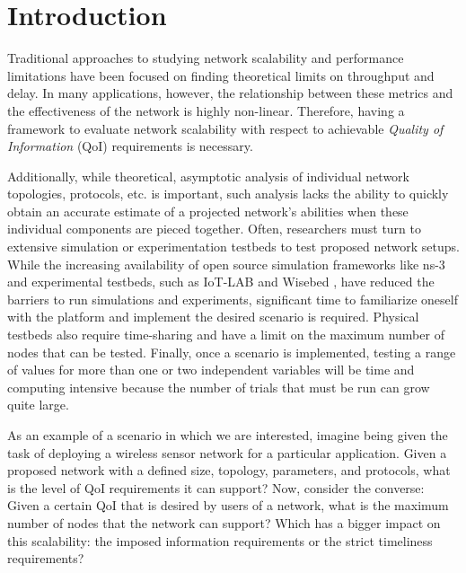 \section{Introduction}
\label{sec:intro}


Traditional approaches to studying network scalability and performance limitations have been focused on finding theoretical limits on throughput and delay.  In many applications, however, the relationship between these metrics and the effectiveness of the network is highly non-linear.  Therefore, having a framework to evaluate network scalability with respect to achievable \emph{Quality of Information} (QoI) requirements is necessary.

Additionally, while theoretical, asymptotic analysis of individual network topologies, protocols, etc. is important, such analysis lacks the ability to quickly obtain an accurate estimate of a projected network's abilities when these individual components are pieced together. Often, researchers must turn to extensive simulation or experimentation testbeds to test proposed network setups. While the increasing availability of open source simulation frameworks like ns-3 \cite{ns3} and experimental testbeds, such as IoT-LAB \cite{iot_lab_exp_platform} and Wisebed \cite{wisebed}, have reduced the barriers to run simulations and experiments, significant time to familiarize oneself with the platform and implement the desired scenario is required. Physical testbeds also require time-sharing and have a limit on the maximum number of nodes that can be tested. Finally, once a scenario is implemented, testing a range of values for more than one or two independent variables will be time and computing intensive because the number of trials that must be run can grow quite large.

As an example of a scenario in which we are interested, imagine being given the task of deploying a wireless sensor network for a particular application. Given a proposed network with a defined size, topology, parameters, and protocols, what is the level of QoI requirements it can support?  Now, consider the converse:  Given a certain QoI that is desired by users of a network, what is the maximum number of nodes that the network can support?  Which has a bigger impact on this scalability: the imposed information requirements or the strict timeliness requirements? 

